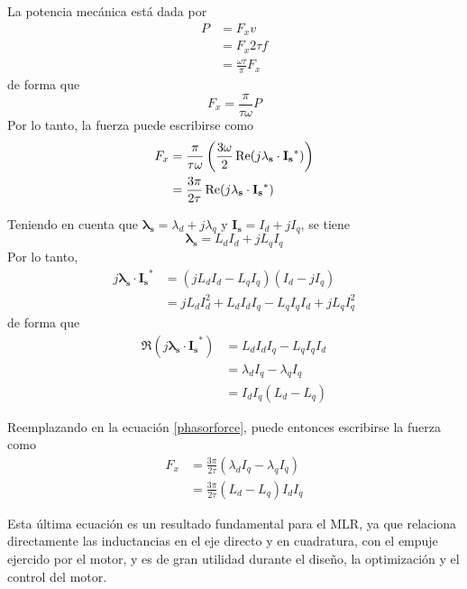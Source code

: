 La potencia mecánica está dada por
\begin{align*}
P &= F_x v \\
&= F_x 2\tau f \\
&= \frac{\omega\tau}{\pi}F_x
\end{align*}
de forma que
\begin{equation}
F_x = \frac{\pi}{\tau\omega}P
\end{equation}
Por lo tanto, la fuerza puede escribirse como
\begin{align}
F_x &= \frac{\pi}{\tau\omega}
\left(
\frac{3\omega}{2}\Re(j\mathbf{\lambda_s}\cdot\mathbf{I_s}^*)
\right) \notag\\
&= \frac{3\pi}{2\tau}\Re(j\mathbf{\lambda_s}\cdot\mathbf{I_s}^*)
\label{phasorforce}
\end{align}

Teniendo en cuenta que $\mathbf{\lambda_s}=\lambda_d+j\lambda_q$  y $\mathbf{I_s}=I_d+jI_q$, se tiene
\begin{equation}
\mathbf{\lambda_s}=L_d I_d + j L_q I_q
\end{equation}
Por lo tanto,
\begin{align*}
j\mathbf{\lambda_s}\cdot\mathbf{I_s}^* &=
(jL_d I_d-L_q I_q)(I_d-j I_q)\\
&= jL_d I_d^2 + L_d I_d I_q - L_q I_q I_d + j L_q I_q^2
\end{align*}
de forma que
\begin{align*}
\Re(j\mathbf{\lambda_s}\cdot\mathbf{I_s}^*) &= L_d I_d I_q - L_q I_q I_d\\
&= \lambda_d I_q - \lambda_q I_q\\
&= I_d I_q(L_d - L_q)
\end{align*}

Reemplazando en la ecuación \ref{phasorforce}, puede entonces escribirse la fuerza como
\begin{align}
F_x &= \frac{3\pi}{2\tau}(\lambda_d I_q - \lambda_q I_q)\\
&= \frac{3\pi}{2\tau}(L_d - L_q)I_d I_q
\end{align}

Esta última ecuación es un resultado fundamental para el MLR, ya que relaciona directamente las inductancias en el eje directo y en cuadratura, con el empuje ejercido por el motor, y es de gran utilidad durante el diseño, la optimización y el control del motor.

